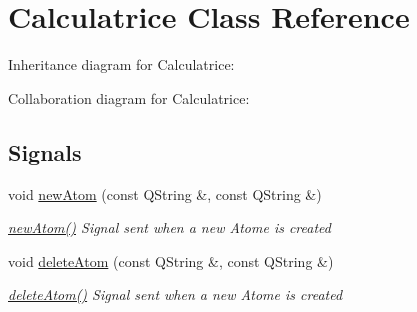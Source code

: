 \hypertarget{class_calculatrice}{}\section{Calculatrice Class Reference}
\label{class_calculatrice}


Inheritance diagram for Calculatrice\+:


Collaboration diagram for Calculatrice\+:
\subsection*{Signals}
\begin{DoxyCompactItemize}
\item 
void \hyperlink{class_calculatrice_a5b379ff16856c59cd94d0f460b0d0d73}{new\+Atom} (const Q\+String \&, const Q\+String \&)
\begin{DoxyCompactList}\small\item\em \hyperlink{class_calculatrice_a5b379ff16856c59cd94d0f460b0d0d73}{new\+Atom()} Signal sent when a new Atome is created \end{DoxyCompactList}\item 
void \hyperlink{class_calculatrice_a5c1b210bef9aa7bd162478d35412b36b}{delete\+Atom} (const Q\+String \&, const Q\+String \&)
\begin{DoxyCompactList}\small\item\em \hyperlink{class_calculatrice_a5c1b210bef9aa7bd162478d35412b36b}{delete\+Atom()} Signal sent when a new Atome is created \end{DoxyCompactList}\end{DoxyCompactItemize}
